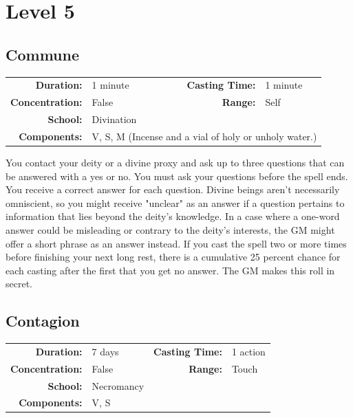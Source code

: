 \documentclass[12pt,showtrims]{memoir}
\begin{document}
\newpage
\chapter*{Level 5} 
\section*{Commune}

{
\small\centering\vspace{-6pt}
\begin{tabular}{rlrl}
\toprule

\textbf{Duration:} & 1 minute &
\textbf{Casting Time:} & 1 minute \\
\textbf{Concentration:} & False &
\textbf{Range:} & Self \\
\textbf{School:} & Divination \\
\textbf{Components:} & \multicolumn{3}{p{0.7\textwidth}}{V, S, M (Incense and a vial of holy or unholy water.)}\\

\bottomrule
\end{tabular}
}

\vspace{1\baselineskip}\noindent You contact your deity or a divine proxy and ask up to three questions that can be answered with a yes or no. You must ask your questions before the spell ends. You receive a correct answer for each question. Divine beings aren't necessarily omniscient, so you might receive "unclear" as an answer if a question pertains to information that lies beyond the deity's knowledge. In a case where a one-word answer could be misleading or contrary to the deity's interests, the GM might offer a short phrase as an answer instead. If you cast the spell two or more times before finishing your next long rest, there is a cumulative 25 percent chance for each casting after the first that you get no answer. The GM makes this roll in secret.

\newpage
\section*{Contagion}

{
\small\centering\vspace{-6pt}
\begin{tabular}{rlrl}
\toprule

\textbf{Duration:} & 7 days &
\textbf{Casting Time:} & 1 action \\
\textbf{Concentration:} & False &
\textbf{Range:} & Touch \\
\textbf{School:} & Necromancy \\
\textbf{Components:} & \multicolumn{3}{p{0.7\textwidth}}{V, S}\\

\bottomrule
\end{tabular}
}
\end{document}
